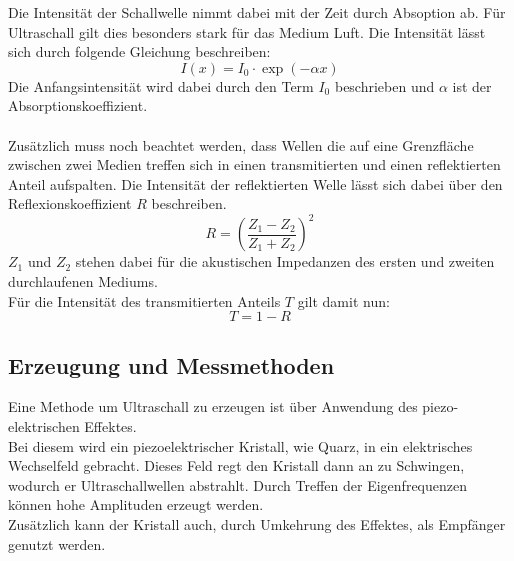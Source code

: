 \noindent
Die Intensität der Schallwelle nimmt dabei mit der Zeit durch Absoption ab. 
Für Ultraschall gilt dies besonders stark für das Medium Luft.
Die Intensität lässt sich durch folgende Gleichung beschreiben:
\begin{equation*}
  I(x)=I_0\cdot \exp{(-\alpha x)}  
\end{equation*}
Die Anfangsintensität wird dabei durch den Term $I_0$ beschrieben und $\alpha$ ist der Absorptionskoeffizient.\\\\
Zusätzlich muss noch beachtet werden, dass Wellen die auf eine Grenzfläche zwischen zwei Medien treffen sich in einen transmitierten und einen reflektierten Anteil aufspalten.
Die Intensität der reflektierten Welle lässt sich dabei über den Reflexionskoeffizient $R$ beschreiben.
\begin{equation*}
    R=\left(\frac{Z_1-Z_2}{Z_1+Z_2}\right)^2
\end{equation*}
$Z_1$ und $Z_2$ stehen dabei für die akustischen Impedanzen des ersten und zweiten durchlaufenen Mediums.\\
Für die Intensität des transmitierten Anteils $T$ gilt damit nun:
\begin{equation*}
    T=1-R
\end{equation*}




\subsection{Erzeugung und Messmethoden}

Eine Methode um Ultraschall zu erzeugen ist über Anwendung des piezo-elektrischen Effektes.\\
Bei diesem wird ein piezoelektrischer Kristall, wie Quarz, in ein elektrisches Wechselfeld gebracht. 
Dieses Feld regt den Kristall dann an zu Schwingen, wodurch er Ultraschallwellen abstrahlt. 
Durch Treffen der Eigenfrequenzen können hohe Amplituden erzeugt werden.\\
Zusätzlich kann der Kristall auch, durch Umkehrung des Effektes, als Empfänger genutzt werden.\\\\

